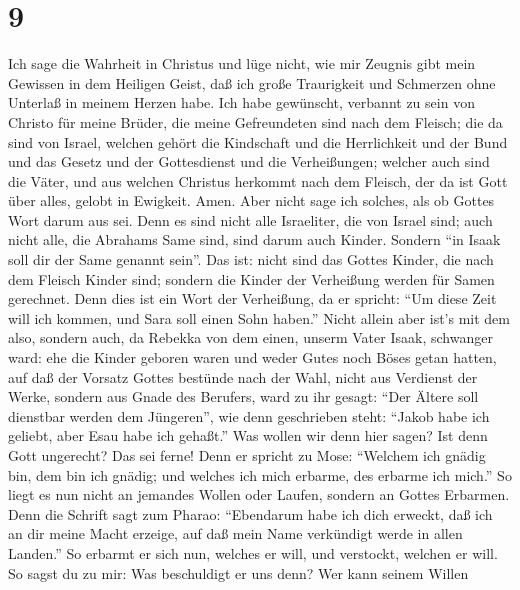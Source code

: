 \hypertarget{section-8}{%
\section{9}\label{section-8}}

 Ich sage die Wahrheit in Christus und lüge nicht, wie mir
Zeugnis gibt mein Gewissen in dem Heiligen Geist,  daß ich
große Traurigkeit und Schmerzen ohne Unterlaß in meinem Herzen habe.
 Ich habe gewünscht, verbannt zu sein von Christo für meine
Brüder, die meine Gefreundeten sind nach dem Fleisch;  die
da sind von Israel, welchen gehört die Kindschaft und die Herrlichkeit
und der Bund und das Gesetz und der Gottesdienst und die Verheißungen;
 welcher auch sind die Väter, und aus welchen Christus
herkommt nach dem Fleisch, der da ist Gott über alles, gelobt in
Ewigkeit. Amen.  Aber nicht sage ich solches, als ob Gottes
Wort darum aus sei. Denn es sind nicht alle Israeliter, die von Israel
sind;  auch nicht alle, die Abrahams Same sind, sind darum
auch Kinder. Sondern ``in Isaak soll dir der Same genannt sein''.
 Das ist: nicht sind das Gottes Kinder, die nach dem Fleisch
Kinder sind; sondern die Kinder der Verheißung werden für Samen
gerechnet.  Denn dies ist ein Wort der Verheißung, da er
spricht: ``Um diese Zeit will ich kommen, und Sara soll einen Sohn
haben.''  Nicht allein aber ist's mit dem also, sondern
auch, da Rebekka von dem einen, unserm Vater Isaak, schwanger ward:
 ehe die Kinder geboren waren und weder Gutes noch Böses
getan hatten, auf daß der Vorsatz Gottes bestünde nach der Wahl,
 nicht aus Verdienst der Werke, sondern aus Gnade des
Berufers, ward zu ihr gesagt: ``Der Ältere soll dienstbar werden dem
Jüngeren'',  wie denn geschrieben steht: ``Jakob habe ich
geliebt, aber Esau habe ich gehaßt.''  Was wollen wir denn
hier sagen? Ist denn Gott ungerecht? Das sei ferne!  Denn
er spricht zu Mose: ``Welchem ich gnädig bin, dem bin ich gnädig; und
welches ich mich erbarme, des erbarme ich mich.''  So liegt
es nun nicht an jemandes Wollen oder Laufen, sondern an Gottes Erbarmen.
 Denn die Schrift sagt zum Pharao: ``Ebendarum habe ich
dich erweckt, daß ich an dir meine Macht erzeige, auf daß mein Name
verkündigt werde in allen Landen.''  So erbarmt er sich
nun, welches er will, und verstockt, welchen er will.  So
sagst du zu mir: Was beschuldigt er uns denn? Wer kann seinem Willen
